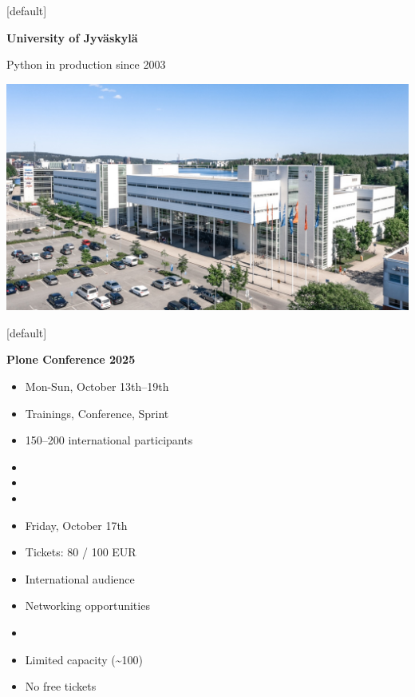 \documentclass[12pt,aspectratio=169]{beamer}
\begin{document}
[default]
\begin{frame}
  \begin{minipage}{0.58\textwidth}
    \centering
    \huge \textbf{University of Jyväskylä}
    \par
    \vspace{0.5cm}
    \normalsize
    Python in production since 2003
  \end{minipage}
  \begin{minipage}{0.4\textwidth}
    \centering
    \vfill
    \includegraphics[height=\paperheight, trim=6cm 0cm 0cm 0cm, clip]{images/venue.jpg}
    \vfill
  \end{minipage}
\end{frame}

[default]
\begin{frame}
  \begin{minipage}{0.48\textwidth}
    \textbf{Plone Conference 2025}
    \begin{itemize}
      \item Mon-Sun, October 13th–19th
      \item Trainings, Conference, Sprint
      \item 150–200 international participants
      \item[]
      \item[]
      \item[]
    \end{itemize}
  \end{minipage}
  \hfill
  \begin{minipage}{0.48\textwidth}
    \begin{itemize}
      \item Friday, October 17th
      \item Tickets: 80 / 100 EUR
      \item International audience
      \item Networking opportunities
      \item[]
      \item[] \small Limited capacity (\textasciitilde 100)
      \item[] \small No free tickets
    \end{itemize}
  \end{minipage}
\end{frame}
\end{document}
